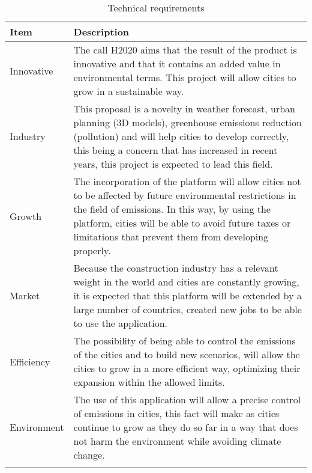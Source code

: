 \begin{longtable}[H]{l p{12cm}}
		
		\toprule[2pt]
		
		\textbf{Item} &  \textbf{Description}\\
		
		\midrule [1.5pt]
		
		Innovative & The call H2020 aims that the result of the product is innovative and that it contains an added value in environmental terms. This project will allow cities to grow in a sustainable way.\vspace{0.2cm}\\
		
		\midrule
		
		Industry & This proposal is a novelty in weather forecast, urban planning (3D models), greenhouse emissions reduction (pollution) and will help cities to develop correctly, this being a concern that has increased in recent years, this project is expected to lead this field.\vspace{0.2cm}\\
		
		\midrule
		
		Growth & The incorporation of the platform will allow cities not to be affected by future environmental restrictions in the field of emissions. In this way, by using the platform, cities will be able to avoid future taxes or limitations that prevent them from developing properly.\vspace{0.2cm}\\
		
		\midrule
		
		Market & Because the construction industry has a relevant weight in the world and cities are constantly growing, it is expected that this platform will be extended by a large number of countries, created new jobs to be able to use the application.\vspace{0.2cm}\\
		
		\midrule
		
		Efficiency & The possibility of being able to control the emissions of the cities and to build new scenarios, will allow the cities to grow in a more efficient way, optimizing their expansion within the allowed limits.\vspace{0.2cm}\\
		
		\midrule
		
		Environment & The use of this application will allow a precise control of emissions in cities, this fact will make as cities continue to grow as they do so far in a way that does not harm the environment while avoiding climate change.\vspace{0.2cm}\\
		
		
		\bottomrule[2pt]
	\caption{Technical requirements}
\end{longtable}

